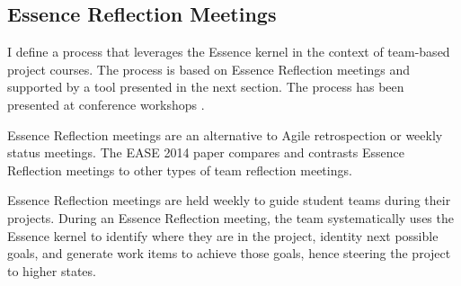 \documentclass[preprint,12pt,3p]{elsarticle}
\begin{document}

\subsection{Essence Reflection Meetings}
\label{EssenceReflectionMeetings}
I define a process that leverages the Essence kernel in the context of team-based project courses. The process is based on Essence Reflection meetings and supported by a tool presented in the next section. The process has been presented at conference workshops \cite{SCSE2015Tutorial, CSEET2015Workshop}. 

Essence Reflection meetings are an alternative to Agile retrospection or weekly status meetings. The EASE 2014 paper \cite{EASE2014} compares and contrasts Essence Reflection meetings to other types of team reflection meetings.

Essence Reflection meetings are held weekly to guide student teams during their projects. During an Essence Reflection meeting, the team systematically uses the Essence kernel to identify where they are in the project, identity next possible goals, and generate work items to achieve those goals, hence steering the project to higher states. 

\end{document}
